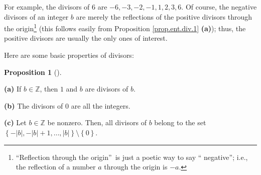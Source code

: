 \documentclass[numbers=enddot,12pt,final,onecolumn,notitlepage]{scrartcl}%
\numberwithin{exer}{subsection}
\theoremstyle{definition}
\newtheorem{prop}[theo]{Proposition}
\newenvironment{proposition}[1][]
{\begin{prop}[#1]\begin{leftbar}}
{\end{leftbar}\end{prop}}
\begin{document}
For example, the divisors of $6$ are $-6,-3,-2,-1,1,2,3,6$. Of course, the
negative divisors of an integer $b$ are merely the reflections of the positive
divisors through the origin\footnote{\textquotedblleft Reflection through the
origin\textquotedblright\ is just a poetic way to say \textquotedblleft
negative\textquotedblright; i.e., the reflection of a number $a$ through the
origin is $-a$.} (this follows easily from Proposition \ref{prop.ent.div.1}
\textbf{(a)}); thus, the positive divisors are usually the only ones of interest.

Here are some basic properties of divisors:

\begin{proposition}
\label{prop.ent.divisors.find}\textbf{(a)} If $b\in\mathbb{Z}$, then $1$ and
$b$ are divisors of $b$.

\textbf{(b)} The divisors of $0$ are all the integers.

\textbf{(c)} Let $b\in\mathbb{Z}$ be nonzero. Then, all divisors of $b$ belong
to the set $\left\{  -\left\vert b\right\vert ,-\left\vert b\right\vert
+1,\ldots,\left\vert b\right\vert \right\}  \setminus\left\{  0\right\}  $.
\end{proposition}
\end{document}
